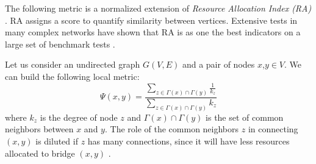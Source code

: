 The following metric is a normalized extension of \textit{Resource Allocation Index (RA)} \cite{berlusconi2016link, Lu2011,zhou2009predicting}. RA assigns a score to quantify similarity between vertices. Extensive tests in many complex networks have shown that RA is as one the best indicators on a large set of benchmark tests  \cite{berlusconi2016link,Lu2011}.


Let us consider an undirected graph $G(V,E)$ and a pair of nodes $x$,$y\in V$. We can build the following local metric:
%
\begin{equation}
\label{eqn:prediction-local}
\Psi(x,y)=
\frac{\sum\limits_{z\in \Gamma(x) \cap \Gamma(y)}\frac{1}{k_{z}}}
{\sum\limits_{z\in \Gamma(x) \cap \Gamma(y)}k_{z}}
\end{equation}
%
where $k_{z}$ is the degree of node $z$ and $\Gamma(x) \cap \Gamma(y)$ is the set of common neighbors between $x$ and $y$. The role of the common neighbors $z$ in connecting $(x, y)$ is diluted if $z$ has many connections, since it will have less resources allocated to bridge $(x, y)$ \cite{berlusconi2016link}.







